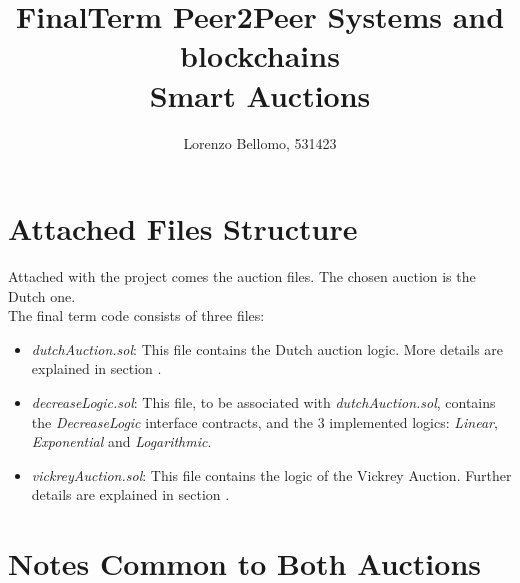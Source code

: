 \documentclass[11pt, a4paper]{report}
\title{
	FinalTerm Peer2Peer Systems and blockchains \\
	\large Smart Auctions}
\author{Lorenzo Bellomo, 531423}
\date{}
\begin{document}
	\maketitle
	
\section*{Attached Files Structure}

	Attached with the project comes the auction files. The chosen auction is the Dutch one. \\
	The final term code consists of three files:
	\begin{itemize}
		\item \emph{dutchAuction.sol}: This file contains the Dutch auction logic. More details are explained in section .
		\item \emph{decreaseLogic.sol}: This file, to be associated with \emph{dutchAuction.sol}, contains the \emph{DecreaseLogic} interface contracts, and the 3 implemented logics: \emph{Linear}, \emph{Exponential} and \emph{Logarithmic}.
		\item \emph{vickreyAuction.sol}: This file contains the logic of the Vickrey Auction. Further details are explained in section .
	\end{itemize}

\section*{Notes Common to Both Auctions}
\label{sec:common}
\end{document}
